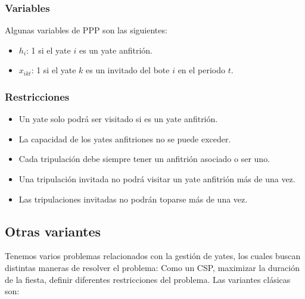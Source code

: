 \documentclass[letter, 10pt]{article}
\begin{document}
\subsubsection{Variables}
Algunas variables de PPP son las siguientes:

    \begin{itemize}
      \item $h_i$: 1 si el yate $i$ es un yate anfitrión.
      \item $x_{ikt}$: 1 si el yate $k$ es un invitado del bote $i$ en el periodo $t$.
    \end{itemize}

\subsubsection{Restricciones}
\begin{itemize}
\item Un yate solo podrá ser visitado si es un yate anfitrión.
\item La capacidad de los yates anfitriones no se puede exceder.
\item Cada tripulación debe siempre tener un anfitrión asociado o ser uno.
\item Una tripulación invitada no podrá visitar un yate anfitrión más de una vez.
\item Las tripulaciones invitadas no podrán toparse más de una vez.
\end{itemize}

\subsection{Otras variantes}
Tenemos varios problemas relacionados con la gestión de yates, los cuales buscan distintas maneras de resolver el problema: Como un CSP, maximizar la duración de la fiesta, definir diferentes restricciones del problema. Las variantes clásicas son:
\end{document}
